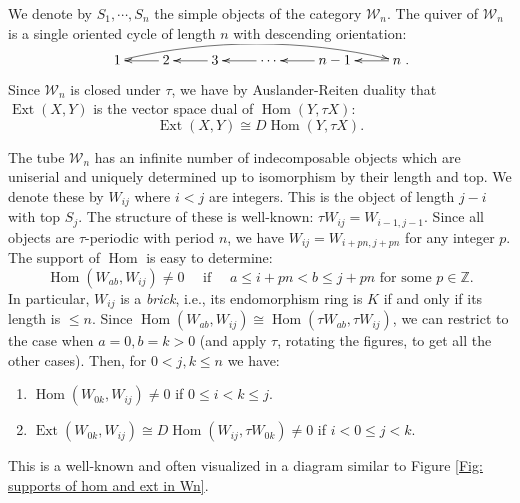 \documentclass[11pt]{amsart}
\theoremstyle{definition}
\theoremstyle{remark}
\numberwithin{equation}{section}
\DeclareMathOperator{\Hom}{Hom}%
\DeclareMathOperator{\Ext}{Ext}%
\newcommand{\field}[1]{\mathbb{#1}}
\newcommand{\ZZ}{\ensuremath{{\field{Z}}}}
\newcommand{\cW}{\ensuremath{{\mathcal{W}}}}
\begin{document}
We denote by $S_1,\cdots,S_n$ the simple objects of the category $\cW_n$. The quiver of $\cW_n$ is a single oriented cycle of length $n$ with descending orientation: 
\[
\xymatrixrowsep{20pt}%
\xymatrix{%
1 \ar@/^1pc/[rrrrr] & 2\ar[l] & 3\ar[l] & \cdots\ar[l] & n-1\ar[l]&
	n \ar[l]}. %
\]
Since $\cW_n$ is closed under $\tau$, we have by Auslander-Reiten duality that $\Ext(X,Y)$ is the vector space dual of $\Hom(Y,\tau X)$:
\[
	\Ext(X,Y)\cong D\Hom(Y,\tau X).
\]


The tube $\cW_n$ has an infinite number of indecomposable objects which are uniserial and uniquely determined up to isomorphism by their length and top. We denote these by $W_{ij}$ where $i<j$ are integers. This is the object of length $j-i$ with top $S_j$. The structure of these is well-known: $\tau W_{ij}=W_{i-1,j-1}$. Since all objects are $\tau$-periodic with period $n$, we have $W_{ij}=W_{i+pn,j+pn}$ for any integer $p$. The support of $\Hom$ is easy to determine: 
\[
\Hom(W_{ab},W_{ij})\neq 0\quad\text{ if }\quad a\le i+pn<b\le j+pn \text{ for some $p\in\ZZ$}.
\]
In particular, $W_{ij}$ is a \emph{brick}, i.e., its endomorphism ring is $K$ if and only if its length is $\le n$. Since $\Hom(W_{ab},W_{ij})\cong \Hom(\tau W_{ab},\tau W_{ij})$, we can restrict to the case when $a=0,b=k>0$ (and apply $\tau$, rotating the figures, to get all the other cases). Then, for $0<j,k\le n$ we have:
\begin{enumerate}
\item[(a)] $\Hom(W_{0k},W_{ij})\neq0$ if $0\le i<k\le j$.
\item[(b)] $\Ext(W_{0k},W_{ij})\cong D\Hom(W_{ij},\tau W_{0k})\neq0$ if $i<0\le j<k$.
\end{enumerate}
This is a well-known and often visualized in a diagram similar to Figure \ref{Fig: supports of hom and ext in Wn}.
%
\end{document}
